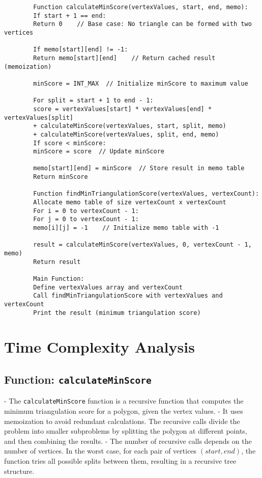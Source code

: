 \documentclass[a4paper,12pt]{report}
\begin{document}
\begin{tcolorbox}[colback=white, colframe=black, boxrule=0.5pt]
	\ttfamily\small
	\begin{verbatim}
		Function calculateMinScore(vertexValues, start, end, memo):
		If start + 1 == end:
		Return 0    // Base case: No triangle can be formed with two vertices
		
		If memo[start][end] != -1:
		Return memo[start][end]    // Return cached result (memoization)
		
		minScore = INT_MAX  // Initialize minScore to maximum value
		
		For split = start + 1 to end - 1:
		score = vertexValues[start] * vertexValues[end] * vertexValues[split]
		+ calculateMinScore(vertexValues, start, split, memo)
		+ calculateMinScore(vertexValues, split, end, memo)
		If score < minScore:
		minScore = score  // Update minScore
		
		memo[start][end] = minScore  // Store result in memo table
		Return minScore
		
		Function findMinTriangulationScore(vertexValues, vertexCount):
		Allocate memo table of size vertexCount x vertexCount
		For i = 0 to vertexCount - 1:
		For j = 0 to vertexCount - 1:
		memo[i][j] = -1    // Initialize memo table with -1
		
		result = calculateMinScore(vertexValues, 0, vertexCount - 1, memo)
		Return result
		
		Main Function:
		Define vertexValues array and vertexCount
		Call findMinTriangulationScore with vertexValues and vertexCount
		Print the result (minimum triangulation score)
	\end{verbatim}
\end{tcolorbox}

\section*{Time Complexity Analysis}

\subsection*{Function: \texttt{calculateMinScore}}

- The \texttt{calculateMinScore} function is a recursive function that computes the minimum triangulation score for a polygon, given the vertex values.
- It uses memoization to avoid redundant calculations. The recursive calls divide the problem into smaller subproblems by splitting the polygon at different points, and then combining the results.
- The number of recursive calls depends on the number of vertices. In the worst case, for each pair of vertices \((start, end)\), the function tries all possible splits between them, resulting in a recursive tree structure.
\end{document}
